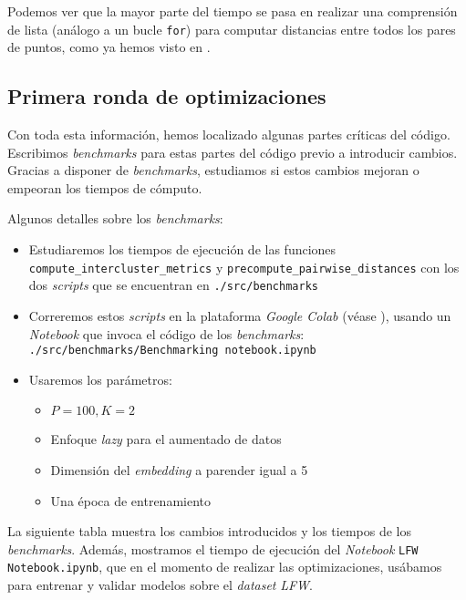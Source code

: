 Podemos ver que la mayor parte del tiempo se pasa en realizar una comprensión de lista (análogo a un bucle \lstinline{for}) para computar distancias entre todos los pares de puntos, como ya hemos visto en .

\subsection{Primera ronda de optimizaciones}

Con toda esta información, hemos localizado algunas partes críticas del código. Escribimos \textit{benchmarks} para estas partes del código previo a introducir cambios. Gracias a disponer de \textit{benchmarks}, estudiamos si estos cambios mejoran o empeoran los tiempos de cómputo.

Algunos detalles sobre los \textit{benchmarks}:

\begin{itemize}
    \item Estudiaremos los tiempos de ejecución de las funciones \lstinline{compute_intercluster_metrics} y \lstinline{precompute_pairwise_distances} con los dos \textit{scripts} que se encuentran en \lstinline{./src/benchmarks}
    \item Correremos estos \textit{scripts} en la plataforma \textit{Google Colab} (véase ), usando un \textit{Notebook} que invoca el código de los \textit{benchmarks}: \lstinline{./src/benchmarks/Benchmarking notebook.ipynb}
    \item Usaremos los parámetros:
        \begin{itemize}
            \item $P = 100, K = 2$
            \item Enfoque \textit{lazy} para el aumentado de datos
            \item Dimensión del \textit{embedding} a parender igual a 5
            \item Una época de entrenamiento
        \end{itemize}
\end{itemize}

La siguiente tabla muestra los cambios introducidos y los tiempos de los \textit{benchmarks}. Además, mostramos el tiempo de ejecución del \textit{Notebook} \lstinline{LFW Notebook.ipynb}, que en el momento de realizar las optimizaciones, usábamos para entrenar y validar modelos sobre el \textit{dataset} \textit{LFW}.

